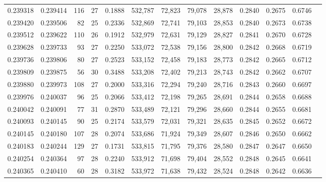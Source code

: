\begin{tabular}{rrrrrrrrrrrrr}
0.239318 & 0.239414 & 116 &  27 &                                     0.1888 & 532,787 &  72,823 &  79,078 &  28,878 & 0.2840 & 0.2675 & 0.6746 \\
0.239420 & 0.239506 &  82 &  25 &                                     0.2336 & 532,869 &  72,741 &  79,103 &  28,853 & 0.2840 & 0.2673 & 0.6738 \\
0.239512 & 0.239622 & 110 &  26 &                                     0.1912 & 532,979 &  72,631 &  79,129 &  28,827 & 0.2841 & 0.2670 & 0.6728 \\
0.239628 & 0.239733 &  93 &  27 &                                     0.2250 & 533,072 &  72,538 &  79,156 &  28,800 & 0.2842 & 0.2668 & 0.6719 \\
0.239736 & 0.239806 &  80 &  27 &                                     0.2523 & 533,152 &  72,458 &  79,183 &  28,773 & 0.2842 & 0.2665 & 0.6712 \\
0.239809 & 0.239875 &  56 &  30 &                                     0.3488 & 533,208 &  72,402 &  79,213 &  28,743 & 0.2842 & 0.2662 & 0.6707 \\
0.239880 & 0.239973 & 108 &  27 &                                     0.2000 & 533,316 &  72,294 &  79,240 &  28,716 & 0.2843 & 0.2660 & 0.6697 \\
0.239976 & 0.240037 &  96 &  25 &                                     0.2066 & 533,412 &  72,198 &  79,265 &  28,691 & 0.2844 & 0.2658 & 0.6688 \\
0.240042 & 0.240091 &  77 &  31 &                                     0.2870 & 533,489 &  72,121 &  79,296 &  28,660 & 0.2844 & 0.2655 & 0.6681 \\
0.240093 & 0.240145 &  90 &  25 &                                     0.2174 & 533,579 &  72,031 &  79,321 &  28,635 & 0.2845 & 0.2652 & 0.6672 \\
0.240145 & 0.240180 & 107 &  28 &                                     0.2074 & 533,686 &  71,924 &  79,349 &  28,607 & 0.2846 & 0.2650 & 0.6662 \\
0.240183 & 0.240244 & 129 &  27 &                                     0.1731 & 533,815 &  71,795 &  79,376 &  28,580 & 0.2847 & 0.2647 & 0.6650 \\
0.240254 & 0.240364 &  97 &  28 &                                     0.2240 & 533,912 &  71,698 &  79,404 &  28,552 & 0.2848 & 0.2645 & 0.6641 \\
0.240365 & 0.240410 &  60 &  28 &                                     0.3182 & 533,972 &  71,638 &  79,432 &  28,524 & 0.2848 & 0.2642 & 0.6636 \\

\end{tabular}
